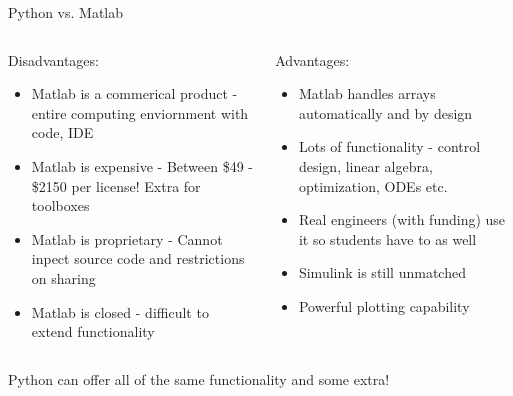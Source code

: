 \documentclass[11pt,professionalfonts,aspectratio=169,final]{beamer}
\begin{document}
\begin{frame}{Python vs. Matlab}
\begin{columns}[t]
\begin{column}{0.5\textwidth}
Disadvantages:
    \begin{itemize}
        \item Matlab is a commerical product - entire computing enviornment with code, IDE
        \item Matlab is expensive - Between \$49 - \$2150 per license! Extra for toolboxes
        \item Matlab is proprietary - Cannot inpect source code and restrictions on sharing 
        \item Matlab is closed - difficult to extend functionality 
    \end{itemize}
\end{column}
\pause
\begin{column}{0.5\textwidth}
    Advantages:
    \begin{itemize}
        \item Matlab handles arrays automatically and by design
        \item Lots of functionality - control design, linear algebra, optimization, ODEs etc.
        \item Real engineers (with funding) use it so students have to as well
        \item Simulink is still unmatched
        \item Powerful plotting capability
    \end{itemize}
\end{column}
\end{columns}

\begin{alertblock}{}
    \centering
    Python can offer all of the same functionality and some extra!
\end{alertblock}
\end{frame}
\end{document}
